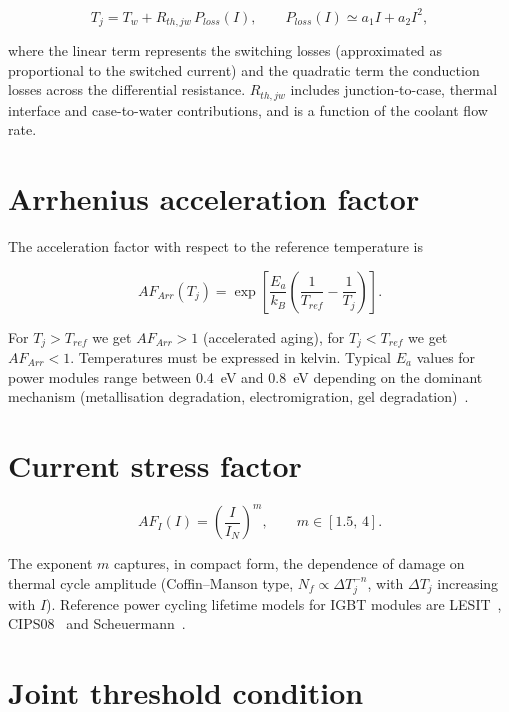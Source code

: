 \documentclass[11pt,a4paper]{article}
\begin{document}
\begin{equation}
  T_j = T_w + R_{th,jw}\,P_{loss}(I),
  \qquad
  P_{loss}(I) \simeq a_1 I + a_2 I^2 ,
  \label{eq:termico}
\end{equation}

where the linear term represents the switching losses (approximated as
proportional to the switched current) and the quadratic term the conduction
losses across the differential resistance. $R_{th,jw}$ includes
junction-to-case, thermal interface and case-to-water contributions, and is a
function of the coolant flow rate.

\section{Arrhenius acceleration factor}

The acceleration factor with respect to the reference temperature is

\begin{equation}
  AF_{Arr}(T_j) = \exp\!\left[\frac{E_a}{k_B}
  \left(\frac{1}{T_{ref}} - \frac{1}{T_j}\right)\right].
  \label{eq:arrhenius}
\end{equation}

For $T_j > T_{ref}$ we get $AF_{Arr} > 1$ (accelerated aging), for
$T_j < T_{ref}$ we get $AF_{Arr} < 1$. Temperatures must be expressed in
kelvin. Typical $E_a$ values for power modules range between
\SI{0.4}{\electronvolt} and \SI{0.8}{\electronvolt} depending on the dominant
mechanism (metallisation degradation, electromigration, gel
degradation)~\cite{ciappa2002,jep122}.

\section{Current stress factor}

\begin{equation}
  AF_I(I) = \left(\frac{I}{I_N}\right)^{m},
  \qquad m \in [1.5,\,4].
  \label{eq:corrente}
\end{equation}

The exponent $m$ captures, in compact form, the dependence of damage on thermal
cycle amplitude (Coffin--Manson type, $N_f \propto \Delta T_j^{-n}$, with
$\Delta T_j$ increasing with $I$). Reference power cycling lifetime models for
IGBT modules are LESIT~\cite{held1997}, CIPS08~\cite{bayerer2008} and
Scheuermann~\cite{scheuermann2013}.

\section{Joint threshold condition}
\end{document}
